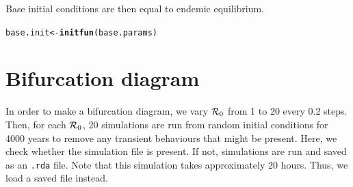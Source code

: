 \documentclass[12pt]{article}\usepackage[]{graphicx}\usepackage[]{color}
\makeatletter
\newcommand{\hlstd}[1]{\textcolor[rgb]{0.345,0.345,0.345}{#1}}%
\newcommand{\hlkwb}[1]{\textcolor[rgb]{0.69,0.353,0.396}{#1}}%
\newcommand{\hlkwd}[1]{\textcolor[rgb]{0.737,0.353,0.396}{\textbf{#1}}}%
\newenvironment{kframe}{%
 \def\at@end@of@kframe{}%
 \ifinner\ifhmode%
  \def\at@end@of@kframe{\end{minipage}}%
  \begin{minipage}{\columnwidth}%
 \fi\fi%
 \def\FrameCommand##1{\hskip\@totalleftmargin \hskip-\fboxsep
 \colorbox{shadecolor}{##1}\hskip-\fboxsep
     \hskip-\linewidth \hskip-\@totalleftmargin \hskip\columnwidth}%
 \MakeFramed {\advance\hsize-\width
   \@totalleftmargin\z@ \linewidth\hsize
   \@setminipage}}%
 {\par\unskip\endMakeFramed%
 \at@end@of@kframe}
\newenvironment{knitrout}{}{} %
\newcommand{\R}{{\cal R}}
\makeatother
\begin{document}
Base initial conditions are then equal to endemic equilibrium.

\begin{knitrout}
\color{fgcolor}\begin{kframe}
\begin{alltt}
\hlstd{base.init} \hlkwb{<-} \hlkwd{initfun}\hlstd{(base.params)}
\end{alltt}
\end{kframe}
\end{knitrout}

\section{Bifurcation diagram}

In order to make a bifurcation diagram, we vary $\R_0$ from 1 to 20 every 0.2 steps. 
Then, for each $\R_0$, 20 simulations are run from random initial conditions for 4000 years to remove any transient behaviours that might be present.
Here, we check whether the simulation file is present. If not, simulations are run and saved as an \texttt{.rda} file.
Note that this simulation takes approximately 20 hours. Thus, we load a saved file instead.
\end{document}
